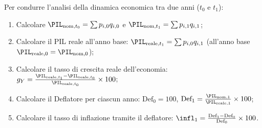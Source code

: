 \begin{metodo}
Per condurre l'analisi della dinamica economica tra due anni ($t_0$ e $t_1$):
\begin{enumerate}
    \item Calcolare $\PIL_{\text{nom}, t_0} = \sum p_{i, 0} q_{i, 0}$ e $\PIL_{\text{nom}, t_1} = \sum p_{i, 1} q_{i, 1}$;
    \item Calcolare il PIL reale all'anno base: $\PIL_{\text{reale}, t_1} = \sum p_{i, 0} q_{i, 1}$ (all'anno base $\PIL_{\text{reale}, 0} = \PIL_{\text{nom}, 0}$);
    \item Calcolare il tasso di crescita reale dell'economia: $g_Y = \frac{\PIL_{\text{reale}, t_1} - \PIL_{\text{reale}, t_0}}{\PIL_{\text{reale}, t_0}} \times 100$;
    \item Calcolare il Deflatore per ciascun anno: $\text{Def}_0 = 100$, $\text{Def}_1 = \frac{\PIL_{\text{nom}, 1}}{\PIL_{\text{reale}, 1}} \times 100$;
    \item Calcolare il tasso di inflazione tramite il deflatore: $\infl_1 = \frac{\text{Def}_1 - \text{Def}_0}{\text{Def}_0} \times 100$.
\end{enumerate}
\end{metodo}

